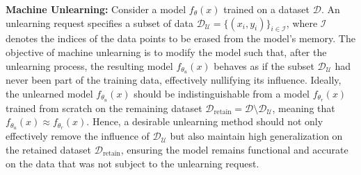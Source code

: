 \vspace{0.15cm}
\noindent \textbf{Machine Unlearning:} Consider a model $f_{\theta}(x)$ trained on a dataset $\mathcal{D}$. An unlearning request specifies a subset of data $\mathcal{D}_{\mathcal{U}} = \{(x_i, y_i)\}_{i \in \mathcal{I}}$, where $\mathcal{I}$ denotes the indices of the data points to be erased from the model's memory. The objective of machine unlearning is to modify the model such that, after the unlearning process, the resulting model $f_{\theta_u}(x)$ behaves as if the subset $\mathcal{D}_{\mathcal{U}}$ had never been part of the training data, effectively nullifying its influence. Ideally, the unlearned model $f_{\theta_u}(x)$ should be indistinguishable from a model $f_{\theta_r}(x)$ trained from scratch on the remaining dataset $\mathcal{D}_\text{retain} = \mathcal{D} \setminus \mathcal{D}_{\mathcal{U}}$, meaning that $f_{\theta_u}(x) \approx f_{\theta_r}(x)$. Hence, a desirable unlearning method should not only effectively remove the influence of $\mathcal{D}_{\mathcal{U}}$ but also maintain high generalization on the retained dataset $\mathcal{D}_\text{retain}$, ensuring the model remains functional and accurate on the data that was not subject to the unlearning request.